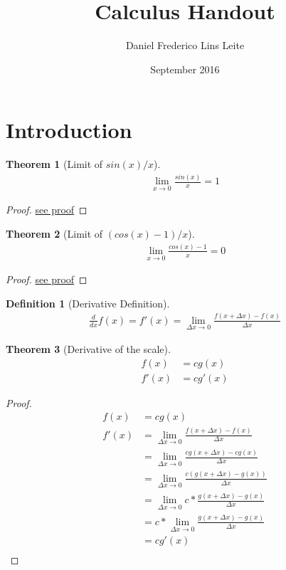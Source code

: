\documentclass{article}
\title{Calculus Handout}
\author{Daniel Frederico Lins Leite}
\date{September 2016}
\newtheorem{theorem}{Theorem}[section]
\theoremstyle{definition}
\newtheorem{definition}{Definition}[theorem]
\begin{document}
\section{Introduction}
\maketitle

\begin{theorem}[Limit of $sin(x)/x$]\label{theorems:limits:sinxoverx}
	\begin{align*}
	\lim_{x \to 0} \frac {sin(x)} {x} = 1
	\end{align*}
\end{theorem}
\begin{proof}
	\href{https://proofwiki.org/wiki/Limit_of_Sine_of_X_over_X}{see proof}
\end{proof}

\begin{theorem}[Limit of $(cos(x)-1)/x$]\label{theorems:limits:cosxminusoneoverx}
	\begin{align*}
	\lim_{x \to 0} \frac {cos(x)-1} {x} = 0
	\end{align*}
\end{theorem}
\begin{proof}
	\href{https://proofwiki.org/wiki/Limit_of_(Cosine_(X)_-_1)_over_X}{see proof}
\end{proof}

\begin{definition}[Derivative Definition]\label{definitions:derivative}
\begin{align*}
\frac {d}{dx} f(x) = f'(x) = \lim_{\Delta x \to 0} {\frac {f(x+\Delta x) - f(x)} {\Delta x}}
\end{align*}
\end{definition}

\begin{theorem}[Derivative of the scale]\label{theorems:calculus:derivatives:scale}
	\begin{align*}
	f(x) &= cg(x)\\
	f'(x) &= cg'(x)
	\end{align*}
\end{theorem}
\begin{proof}
	\begin{align*}
		f(x) &= cg(x) \\
		f'(x) &= \lim_{\Delta x \to 0} {\frac {f(x+\Delta x) - f(x)} {\Delta x}} \\
		&= \lim_{\Delta x \to 0} {\frac {cg(x+\Delta x) - cg(x)} {\Delta x}} \\
		&= \lim_{\Delta x \to 0} {\frac {c(g(x+\Delta x) - g(x))} {\Delta x}} \\
		&= \lim_{\Delta x \to 0} {c * \frac {g(x+\Delta x) - g(x)} {\Delta x}} \\
		&= c*\lim_{\Delta x \to 0} {\frac {g(x+\Delta x) - g(x)} {\Delta x}} \\
		&= cg'(x) \\
	\end{align*}
\end{proof}
\end{document}
